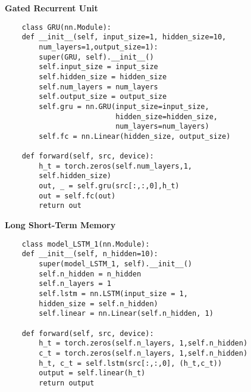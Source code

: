 \textbf{Gated Recurrent Unit}
\begin{lstlisting} 
    class GRU(nn.Module):
    def __init__(self, input_size=1, hidden_size=10,
        num_layers=1,output_size=1):
        super(GRU, self).__init__()
        self.input_size = input_size
        self.hidden_size = hidden_size
        self.num_layers = num_layers
        self.output_size = output_size
        self.gru = nn.GRU(input_size=input_size,
                          hidden_size=hidden_size,
                          num_layers=num_layers)
        self.fc = nn.Linear(hidden_size, output_size)

    def forward(self, src, device):
        h_t = torch.zeros(self.num_layers,1,
        self.hidden_size)
        out, _ = self.gru(src[:,:,0],h_t)
        out = self.fc(out)
        return out
    \end{lstlisting}

\textbf{Long Short-Term Memory}
\begin{lstlisting}
    class model_LSTM_1(nn.Module):
    def __init__(self, n_hidden=10):
        super(model_LSTM_1, self).__init__()
        self.n_hidden = n_hidden
        self.n_layers = 1
        self.lstm = nn.LSTM(input_size = 1, 
        hidden_size = self.n_hidden)
        self.linear = nn.Linear(self.n_hidden, 1)

    def forward(self, src, device):
        h_t = torch.zeros(self.n_layers, 1,self.n_hidden)
        c_t = torch.zeros(self.n_layers, 1,self.n_hidden)
        h_t, c_t = self.lstm(src[:,:,0], (h_t,c_t))
        output = self.linear(h_t)
        return output
    \end{lstlisting}